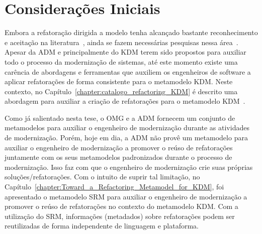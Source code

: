 \section{Considerações Iniciais}

Embora a refatoração dirigida a modelo tenha alcançado bastante reconhecimento e aceitação na literatura~\cite{Moghadam_2012,Maneerat_2011,Fourati_2011,Einarsson_2012,Steimann_2015,Akiyama_2011, Jensen_2010,Arendt_2012,Millan_2009,Tom_2008_2008}, ainda se fazem necessárias pesquisas nessa área~\cite{durelli_systematic_mapping, revisao_sistematica_uml_refactoring}.
Apesar da ADM e principalmente do KDM terem sido propostos para auxiliar todo o processo da modernização de sistemas, até este momento existe uma carência de abordagens e ferramentas que auxiliem os engenheiros de software a aplicar refatorações de forma consistente para o metamodelo KDM. Neste contexto, no Capítulo~\ref{chapter:catalogo_refactoring_KDM} é descrito uma abordagem para auxiliar a criação de refatorações para o metamodelo KDM~\cite{durelli_catalogo}. %


Como já salientado nesta tese, o OMG e a ADM fornecem um conjunto de metamodelos para auxiliar o engenheiro de modernização durante as atividades de modernização. Porém, hoje em dia, a ADM não provê um metamodelo para auxiliar o engenheiro de modernização a promover o reúso de refatorações juntamente com os seus metamodelos padronizados durante o processo de modernização. 
Isso faz com que o engenheiro de modernização crie suas próprias soluções/refatorações. Com o intuito de suprir tal limitação, no Capítulo~\ref{chapter:Toward_a_Refactoring_Metamodel_for_KDM}, foi apresentado o metamodelo SRM para auxiliar o engenheiro de modernização a promover o reúso de refatorações no contexto do metamodelo KDM. Com a utilização do SRM, informações (metadados) sobre refatorações podem ser reutilizadas de forma independente de linguagem e plataforma.



